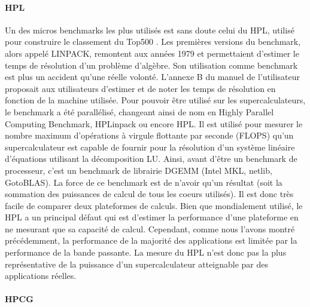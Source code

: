         \paragraph{HPL \cite{Dongarra2003}} 
            Un des micros benchmarks les plus utilisés est sans doute celui du HPL, utilisé pour construire le classement du Top500 \cite{HPC:top500}. Les premières versions du benchmark, alors appelé LINPACK, remontent aux années 1979 et permettaient d'estimer le temps de résolution d'un problème d'algèbre. Son utilisation comme benchmark est plus un accident qu'une réelle volonté. L'annexe B du manuel de l'utilisateur proposait aux utilisateurs d'estimer et de noter les temps de résolution en fonction de la machine utilisée. Pour pouvoir être utilisé sur les supercalculateurs, le benchmark a été parallélisé, changeant ainsi de nom en Highly Parallel Computing Benchmark, HPLinpack ou encore HPL. Il est utilisé pour mesurer le nombre maximum d'opérations à virgule flottante par seconde (\gls{FLOPS}) qu'un supercalculateur est capable de fournir pour la résolution d'un système linéaire d'équations utilisant la décomposition LU. Ainsi, avant d'être un benchmark de processeur, c'est un benchmark de librairie DGEMM (Intel MKL, netlib, GotoBLAS). La force de ce benchmark est de n'avoir qu'un résultat (soit la sommation des puissances de calcul de tous les coeurs utilisés). Il est donc très facile de comparer deux plateformes de calculs. Bien que mondialement utilisé, le HPL a un principal défaut qui est d'estimer la performance d'une plateforme en ne mesurant que sa capacité de calcul. Cependant, comme nous l'avons montré précédemment, la performance de la majorité des applications est limitée par la performance de la bande passante. La mesure du HPL n'est donc pas la plus représentative de la puissance d'un supercalculateur atteignable par des applications réelles. 
        
        \paragraph{HPCG \cite{Dongarra2013}} 
        \label{sec:hpcg}
            
